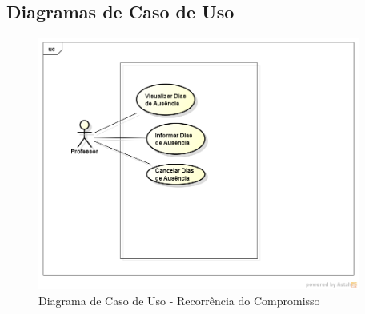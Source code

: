 \documentclass{abnt}
\begin{document}
		\subsection{Diagramas de Caso de Uso}	
		\begin{figure}[h]
			\begin{center}
				 \includegraphics[width=400px]{CasoUsoDiasAusencia}
				 \caption{Diagrama de Caso de Uso - Recorrência do Compromisso}
				 \label{fig:CasoUsoDiasAusencia}
			\end{center}
		\end{figure}
		
\end{document}
